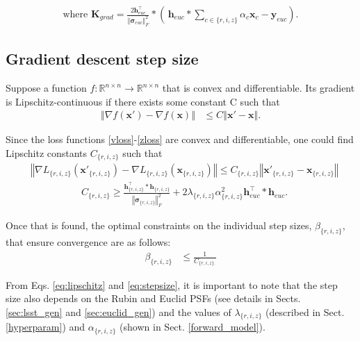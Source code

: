 \documentclass[traditabstract]{aa}
\begin{document}
\begin{align}
    \text{where } \textbf{K}_{grad} =  \frac{2 \mathbf{h}_{euc}^\top}{\left\Vert \mathbf{\sigma}_{euc} \right\Vert_F^2} \ast \left( \hspace{2pt} \mathbf{h}_{euc} \ast \sum\limits_{c\in\{r,i,z\}} \alpha_c \mathbf{x}_c - \mathbf{y}_{euc}\right).
\end{align}


\subsection{Gradient descent step size}
\label{stepsize}
Suppose a function $f: \mathbb{R}^{n\times n} \xrightarrow{} \mathbb{R}^{n\times n}$ that is convex and differentiable. Its gradient is Lipschitz-continuous if there exists some constant C such that
\begin{align*}
    \left\Vert \nabla f(\mathbf{x'}) - \nabla f(\mathbf{x}) \right\Vert &\leq C \left\Vert \mathbf{x'} - \mathbf{x} \right\Vert.
\end{align*}

Since the loss functions \ref{vloss}-\ref{zloss} are convex and differentiable, one could find Lipschitz constants $C_{\{r,i,z\}}$ such that
\begin{align*}
    &\left\Vert \nabla L_{\{r,i,z\}}(\mathbf{x'}_{\{r,i,z\}}) - \nabla L_{\{r,i,z\}}(\mathbf{x}_{\{r,i,z\}}) \right\Vert \leq C_{\{r,i,z\}} \left\Vert \mathbf{x'}_{\{r,i,z\}} - \mathbf{x}_{\{r,i,z\}} \right\Vert
\end{align*}
\begin{align}
    &C_{\{r,i,z\}} \geq \frac{\mathbf{h}^\top_{\{r,i,z\}} \ast \mathbf{h}_{\{r,i,z\}}}{\left\Vert \mathbf{\sigma}_{\{r,i,z\}} \right\Vert_F^2} + 2 \lambda_{\{r,i,z\}} \alpha^2_{\{r,i,z\}} \mathbf{h}_{euc}^\top \ast \mathbf{h}_{euc}. \label{eq:lipschitz}
\end{align}

\noindent Once that is found, the optimal constraints on the individual step sizes, $\beta_{\{r,i,z\}}$, that ensure convergence are as follows:
\begin{align}
    \beta_{\{r,i,z\}} &\leq \frac{1}{C_{\{r,i,z\}.}} \label{eq:stepsize}
\end{align}

\noindent From Eqs. \ref{eq:lipschitz} and \ref{eq:stepsize}, it is important to note that the step size also depends on the Rubin and Euclid PSFs (see details in Sects. \ref{sec:lsst_gen} and \ref{sec:euclid_gen}) and the values of $\lambda_{\{r,i,z\}}$ (described in Sect. \ref{hyperparam}) and $\alpha_{\{r,i,z\}}$ (shown in Sect. \ref{forward_model}).
\end{document}
